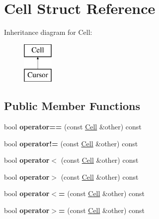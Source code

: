 \hypertarget{structCell}{}\section{Cell Struct Reference}
\label{structCell}
Inheritance diagram for Cell\+:\begin{figure}[H]
\begin{center}
\leavevmode
\includegraphics[height=2.000000cm]{structCell}
\end{center}
\end{figure}
\subsection*{Public Member Functions}
\begin{DoxyCompactItemize}
\item 
\mbox{\label{structCell_aea60edfcaabd317250e371f98b1e3f3c}} 
bool {\bfseries operator==} (const \mbox{\hyperlink{structCell}{Cell}} \&other) const
\item 
\mbox{\label{structCell_abf4ed20e08a46ff76dd68f9ed7151dfd}} 
bool {\bfseries operator!=} (const \mbox{\hyperlink{structCell}{Cell}} \&other) const
\item 
\mbox{\label{structCell_a98302f6dad2edf66dc4892c3b4948138}} 
bool {\bfseries operator$<$} (const \mbox{\hyperlink{structCell}{Cell}} \&other) const
\item 
\mbox{\label{structCell_a671a801cec93c3b0eaf0162b0b8f215b}} 
bool {\bfseries operator$>$} (const \mbox{\hyperlink{structCell}{Cell}} \&other) const
\item 
\mbox{\label{structCell_a9f44cef1bebac7ae45437a047a9bb276}} 
bool {\bfseries operator$<$=} (const \mbox{\hyperlink{structCell}{Cell}} \&other) const
\item 
\mbox{\label{structCell_a1e9f4c165bc4bbd801b5e7d7691f8cb4}} 
bool {\bfseries operator$>$=} (const \mbox{\hyperlink{structCell}{Cell}} \&other) const
\end{DoxyCompactItemize}
